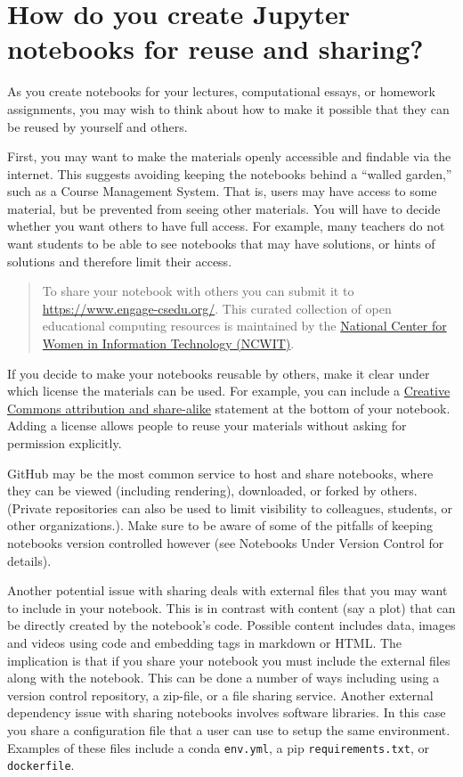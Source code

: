 \documentclass[]{book}
\begin{document}
\hypertarget{how-do-you-create-jupyter-notebooks-for-reuse-and-sharing}{%
\section{How do you create Jupyter notebooks for reuse and sharing?}\label{how-do-you-create-jupyter-notebooks-for-reuse-and-sharing}}

As you create notebooks for your lectures, computational essays, or
homework assignments, you may wish to think about how to make it
possible that they can be reused by yourself and others.

First, you may want to make the materials openly accessible and
findable via the internet. This suggests avoiding keeping the
notebooks behind a ``walled garden,'' such as a Course Management
System. That is, users may have access to some material, but be
prevented from seeing other materials. You will have to decide whether
you want others to have full access. For example, many teachers do not
want students to be able to see notebooks that may have solutions, or
hints of solutions and therefore limit their access.

\begin{quote}
To share your notebook with others you can submit it to
\url{https://www.engage-csedu.org/}. This curated collection of open educational
computing resources is maintained by the
\href{https://www.ncwit.org/}{National Center for Women in Information Technology (NCWIT)}.
\end{quote}

If you decide to make your notebooks reusable by others, make it clear
under which license the materials can be used. For example, you can include a
\href{https://creativecommons.org/licenses/by-sa/3.0/us/}{Creative Commons attribution and share-alike}
statement at the bottom of your notebook. Adding a license allows people to reuse
your materials without asking for permission explicitly.

GitHub may be the most common service to host and share notebooks,
where they can be viewed (including rendering), downloaded, or forked
by others. (Private repositories can also be used to limit visibility
to colleagues, students, or other organizations.). Make sure to be
aware of some of the pitfalls of keeping notebooks version controlled
however (see Notebooks Under Version Control for details).

Another potential issue with sharing deals with external files that
you may want to include in your notebook. This is in contrast with
content (say a plot) that can be directly created by the notebook's
code. Possible content includes data, images and videos using code
and embedding tags in markdown or HTML. The implication is that if
you share your notebook you must include the external files along with
the notebook. This can be done a number of ways including using a
version control repository, a zip-file, or a file sharing service.
Another external dependency issue with sharing notebooks involves
software libraries. In this case you share a configuration file that
a user can use to setup the same environment. Examples of these files
include a conda \texttt{env.yml}, a pip \texttt{requirements.txt}, or \texttt{dockerfile}.
\end{document}
